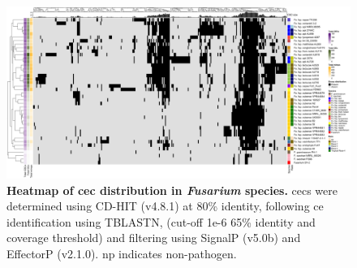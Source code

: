 \begin{figure}
    \centering
    \includegraphics[width=\textwidth]{Figures/EffectorsHeatmap.png}
    \captionsetup{width=24cm}
    \caption[Heatmap of \acl{cec}s distribution in \textit{Fusarium} species.]{\textbf{Heatmap of \acf{cec} distribution in \textit{Fusarium} species.} \Acp{cec} were determined using CD-HIT (v4.8.1) at 80\% identity, following \ac{ce} identification using TBLASTN, (cut-off 1e-6 65\% identity and coverage threshold) and filtering using SignalP (v5.0b) and EffectorP (v2.1.0). np indicates non-pathogen.}
    \label{fig:MaeiHeatmap}
\end{figure}

